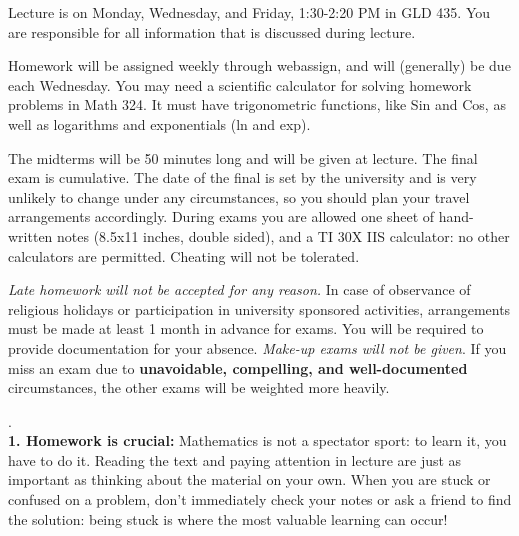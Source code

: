 \documentclass[11 pt]{report}
\begin{document}
\vspace{0.25cm}

  Lecture is on Monday, Wednesday, and Friday, 1:30-2:20 PM in GLD 435.  You
are responsible for all information that is discussed
during lecture.
\vspace{0.25cm}

  Homework will be assigned weekly through webassign, and will (generally) be due each Wednesday. You may need a scientific calculator for solving homework problems in Math 324.  It must have trigonometric functions, like Sin and Cos, as well as logarithms and exponentials (ln and exp).
\vspace{0.25cm}


  The midterms will be 50 minutes long and
will be given at lecture.  The final exam is cumulative. The date of the final is set by the university and is very unlikely to change under any circumstances, so you should plan your travel arrangements accordingly. During exams you are allowed one 
sheet of hand-written notes (8.5x11 inches, double sided), and a TI 30X IIS calculator: no other calculators are permitted. 
Cheating will not be tolerated. 

\vspace{.25cm}

  \emph{Late homework will not be accepted
for any reason.}  In case of observance of religious holidays or
participation in university sponsored activities, arrangements must
be made at least 1 month in advance for exams. You will be required
to provide documentation for your absence. \emph{Make-up exams will
not be given}.  If you miss an exam due to {\bf unavoidable,
compelling, and well-documented} circumstances, the other exams will
be weighted more heavily. \vspace{0.25cm}

\newpage 

. \\
{\bf1.  Homework is crucial:} Mathematics is not a spectator sport: to learn it, you have to do it.
Reading the text and paying attention in lecture are just as important as thinking about
the material on your own. When you are stuck or confused on a problem, don't immediately check your notes or 
ask a friend to find the solution: being stuck is where the most valuable learning can occur! 

\vspace{.2cm}
\end{document}
